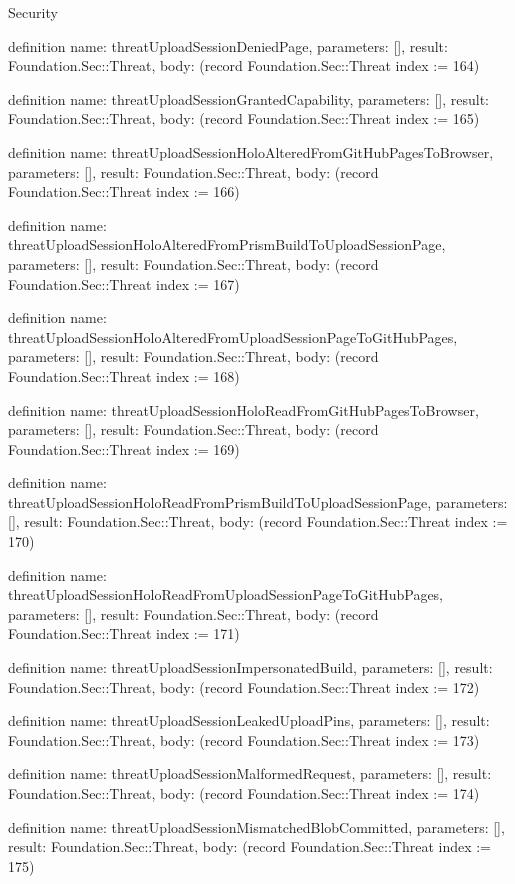 \begin{lexlean}{Security}
\begin{semanticmodule}
definition{
  name: threatUploadSessionDeniedPage,
  parameters: [],
  result: Foundation.Sec::Threat,
  body: (record Foundation.Sec::Threat {index := 164})
}

definition{
  name: threatUploadSessionGrantedCapability,
  parameters: [],
  result: Foundation.Sec::Threat,
  body: (record Foundation.Sec::Threat {index := 165})
}

definition{
  name: threatUploadSessionHoloAlteredFromGitHubPagesToBrowser,
  parameters: [],
  result: Foundation.Sec::Threat,
  body: (record Foundation.Sec::Threat {index := 166})
}

definition{
  name: threatUploadSessionHoloAlteredFromPrismBuildToUploadSessionPage,
  parameters: [],
  result: Foundation.Sec::Threat,
  body: (record Foundation.Sec::Threat {index := 167})
}

definition{
  name: threatUploadSessionHoloAlteredFromUploadSessionPageToGitHubPages,
  parameters: [],
  result: Foundation.Sec::Threat,
  body: (record Foundation.Sec::Threat {index := 168})
}

definition{
  name: threatUploadSessionHoloReadFromGitHubPagesToBrowser,
  parameters: [],
  result: Foundation.Sec::Threat,
  body: (record Foundation.Sec::Threat {index := 169})
}

definition{
  name: threatUploadSessionHoloReadFromPrismBuildToUploadSessionPage,
  parameters: [],
  result: Foundation.Sec::Threat,
  body: (record Foundation.Sec::Threat {index := 170})
}

definition{
  name: threatUploadSessionHoloReadFromUploadSessionPageToGitHubPages,
  parameters: [],
  result: Foundation.Sec::Threat,
  body: (record Foundation.Sec::Threat {index := 171})
}

definition{
  name: threatUploadSessionImpersonatedBuild,
  parameters: [],
  result: Foundation.Sec::Threat,
  body: (record Foundation.Sec::Threat {index := 172})
}

definition{
  name: threatUploadSessionLeakedUploadPins,
  parameters: [],
  result: Foundation.Sec::Threat,
  body: (record Foundation.Sec::Threat {index := 173})
}

definition{
  name: threatUploadSessionMalformedRequest,
  parameters: [],
  result: Foundation.Sec::Threat,
  body: (record Foundation.Sec::Threat {index := 174})
}

definition{
  name: threatUploadSessionMismatchedBlobCommitted,
  parameters: [],
  result: Foundation.Sec::Threat,
  body: (record Foundation.Sec::Threat {index := 175})
}


\end{semanticmodule}
\end{lexlean}
